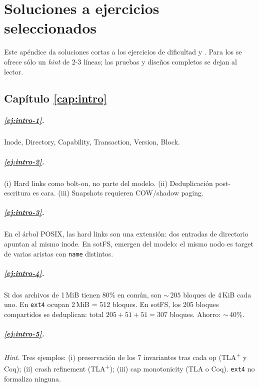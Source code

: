 \chapter{Soluciones a ejercicios seleccionados}
\label{ap:soluciones}

Este apéndice da soluciones cortas a los ejercicios de dificultad
\dificultad{$\star$} y \dificultad{$\star\star$}. Para los
\dificultad{$\star\star\star$} se ofrece sólo un \emph{hint} de 2-3
líneas; las pruebas y diseños completos se dejan al lector.

\section*{Capítulo \ref{cap:intro}}

\paragraph{\ref{ej:intro-1}.} Inode, Directory, Capability, Transaction,
Version, Block.

\paragraph{\ref{ej:intro-2}.} (i) Hard links como bolt-on, no parte del
modelo. (ii) Deduplicación post-escritura es cara. (iii) Snapshots
requieren COW/shadow paging.

\paragraph{\ref{ej:intro-3}.} En el árbol POSIX, las hard links son una
extensión: dos entradas de directorio apuntan al mismo inode. En sotFS,
emergen del modelo: el mismo nodo \Inode{} es target de varias aristas
\econtains{} con \texttt{name} distintos.

\paragraph{\ref{ej:intro-4}.} Si dos archivos de 1\,MiB tienen 80\% en
común, son ${\sim}\,205$ bloques de 4\,KiB cada uno. En \texttt{ext4}
ocupan 2\,MiB = 512 bloques. En sotFS, los 205 bloques compartidos se
deduplican: total $205 + 51 + 51 = 307$ bloques. Ahorro: $\sim$\,40\%.

\paragraph{\ref{ej:intro-5}.} \emph{Hint.} Tres ejemplos: (i) preservación
de los 7 invariantes tras cada op (TLA\textsuperscript{+} y Coq); (ii)
crash refinement (TLA\textsuperscript{+}); (iii) cap monotonicity (TLA
o Coq). \texttt{ext4} no formaliza ninguna.

